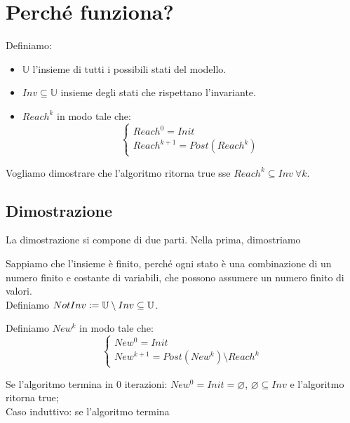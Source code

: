 \documentclass[12pt]{article}
\begin{document}
    \section{Perché funziona?}
    Definiamo:
    \begin{itemize}
        \item $\mathbb U$ l'insieme di tutti i possibili stati del modello. \\
        \item $Inv \subseteq \mathbb U$ insieme degli stati che rispettano l'invariante. \\
        \item $Reach^k$ in modo tale che:
        $$
            \begin{cases}
                Reach^0 = Init \\
                Reach^{k + 1} = Post(Reach^k)
            \end{cases}
        $$
    \end{itemize}
    Vogliamo dimostrare che l'algoritmo ritorna true sse $Reach^k \subseteq Inv\ \forall k$.

    \subsection{Dimostrazione}
    La dimostrazione si compone di due parti.
    Nella prima, dimostriamo
    
    Sappiamo che l'insieme è finito, perché ogni stato è una combinazione di un numero finito e costante di variabili, che possono assumere un numero finito di valori. \\
    Definiamo $NotInv \vcentcolon= \mathbb U \setminus Inv \subseteq \mathbb U$.

    Definiamo $New^k$ in modo tale che:
    $$
        \begin{cases}
            New^0 = Init \\
            New^{k + 1} = Post(New^k) \setminus Reach^k
        \end{cases}
    $$

    Se l'algoritmo termina in 0 iterazioni: $New^0 = Init = \varnothing$, $\varnothing \subseteq Inv$ e l'algoritmo ritorna true;\\
    
    Caso induttivo: se l'algoritmo termina
\end{document}
